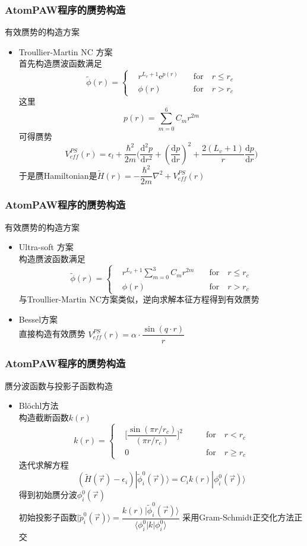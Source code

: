 \documentclass[cjk,slidestop,compress,mathserif,blue]{beamer}
\begin{document}
\frame
{
	\frametitle{\textrm{AtomPAW}程序的赝势构造}
	有效赝势的构造方案
	\begin{itemize}
		\item \textrm{Troullier-Martin NC} 方案 \\
	首先构造赝波函数满足
	\begin{displaymath}
		\tilde\phi(r)=\left\{
			\begin{aligned}
				&r^{L_v+1}\mathrm{e}^{p(r)}\quad &\mathrm{for}\quad r\leqslant r_c \\
				&\phi(r)\quad &\mathrm{for}\quad r>r_c
			\end{aligned}
			\right.
	\end{displaymath}
	这里$$p(r)=\sum_{m=0}^6C_mr^{2m}$$
	可得赝势 
	$$V_{e\!f\!f}^{PS}(r)=\epsilon_l+\dfrac{\hbar^2}{2m}\bigg(\dfrac{\mathrm{d}^2p}{\mathrm{d}r^2}+(\dfrac{\mathrm{d}p}{\mathrm{d}r})^2+\dfrac{2(L_v+1)}r\dfrac{\mathrm{d}p}{\mathrm{d}r}\bigg)$$
	于是赝\textrm{Hamiltonian}是$\tilde H(r)=-\dfrac{\hbar^2}{2m}\nabla^2+V_{e\!f\!f}^{PS}(r)$
	\end{itemize}
}
\frame
{
	\frametitle{\textrm{AtomPAW}程序的赝势构造}
	有效赝势的构造方案
	\begin{itemize}
		\item \textrm{Ultra-soft} 方案 \\
	构造赝波函数满足
	\begin{displaymath}
		\tilde\phi(r)=\left\{
			\begin{aligned}
				&r^{L_v+1}\sum_{m=0}^3C_mr^{2m}\quad &\mathrm{for}\quad r\leqslant r_c \\
				&\phi(r)\quad &\mathrm{for}\quad r>r_c
			\end{aligned}
			\right.
	\end{displaymath}
	与\textrm{Troullier-Martin NC}方案类似，逆向求解本征方程得到有效赝势
		\item \textrm{Bessel}方案\\
			直接构造有效赝势 $V_{e\!f\!f}^{PS}(r)=\alpha\cdot\dfrac{\sin(q\cdot r)}r$
	\end{itemize}
}

\frame
{
	\frametitle{\textrm{AtomPAW}程序的赝势构造}
	赝分波函数与投影子函数构造
	\begin{itemize}
		\item \textrm{Bl\"ochl}方法\\
			构造截断函数$k(r)$
	\begin{displaymath}
		k(r)=\left\{
			\begin{aligned}
				&\bigg[\dfrac{\sin({\pi r/r_c})}{(\pi r/r_c)}\bigg]^2\qquad &\mathrm{for}\quad r<r_c \\
				&0\qquad &\mathrm{for}\quad r\geqslant r_c
			\end{aligned}
			\right.
	\end{displaymath}
	迭代求解方程
	$$(\tilde H(\vec r)-\epsilon_i)|\tilde\phi_i^0(\vec r)\rangle=C_ik(r)|\phi_i^0(\vec r)\rangle$$
	得到初始赝分波$\phi_i^0(\vec r)$\\
	初始投影子函数$|\tilde p_i^0(\vec r)\rangle=\dfrac{k(r)|\tilde\phi_i^0(\vec r)\rangle}{\langle\phi_i^0|k|\phi_i^0\rangle}$
	采用\textrm{Gram-Schmidt}正交化方法正交
	\end{itemize}
}
\end{document}
